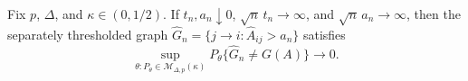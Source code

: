 Fix \(p\), \(\Delta\), and \(\kappa\in(0,1/2)\). If \(t_n,a_n\downarrow0\), \(\sqrt n\,t_n\to\infty\), and \(\sqrt n\,a_n\to\infty\), then the separately thresholded graph \(\widehat G_n=\{j\to i:\widehat A_{ij}>a_n\}\) satisfies \[\sup_{\theta:P_{\theta}\in\mathcal M_{\Delta,p}(\kappa)}P_{\theta}\{\widehat G_n\neq G(A)\}\longrightarrow0.\]